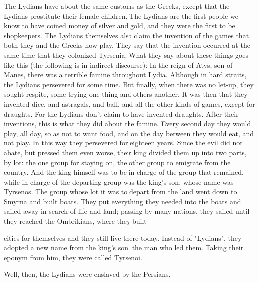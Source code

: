 \begin{latexquotation}
The Lydians have about the same customs as the Greeks, except that the
Lydians prostitute their female children. The Lydians are the first people
we know to have coined money of silver and gold, and they were the first to
be shopkeepers. The Lydians themselves also claim the invention of the
games that both they and the Greeks now play. They say that the invention
occurred at the same time that they colonized Tyrsenia. What they say
about these things goes like this (the following is in indirect discourse):
In the reign of Atys, son of Manes, there was a terrible famine
throughout Lydia. Although in hard straits, the Lydians persevered for
some time. But finally, when there was no let-up, they sought respite,
some trying one thing and others another. It was then that they invented
dice, and astragals, and ball, and all the other kinds of games, except for
draughts. For the Lydians don't claim to have invented draughts. After
their inventions, this is what they did about the famine. Every second
day they would play, all day, so as not to want food, and on the day
between they would eat, and not play. In this way they persevered for
eighteen years. Since the evil did not abate, but pressed them even
worse, their king divided them up into two parts, by lot: the one group
for staying on, the other group to emigrate from the country. And the
king himself was to be in charge of the group that remained, while in
charge of the departing group was the king's son, whose name was
Tyrsenos. The group whose lot it was to depart from the land went down
to Smyrna and built boats. They put everything they needed into the
boats and sailed away in search of life and land; passing by many
nations, they sailed until they reached the Ombrikians, where they built

cities for themselves and they still live there today. Instead of "Lydians",
they adopted a new name from the king's son, the man who led them.
Taking their eponym from him, they were called Tyrsenoi.

Well, then, the Lydians were enslaved by the Persians.
\end{latexquotation}



